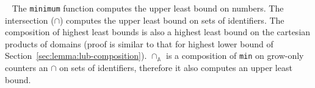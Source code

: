 \documentclass[9pt, oneside]{article}   	%
\begin{document}
\pfsketch~	The \texttt{minimum} function computes the upper least bound on numbers. The intersection ($\cap$) computes the upper least bound on sets of identifiers. The composition of highest least bounds is also a highest least bound on the cartesian products of domains (proof is similar to that for highest lower bound of Section~\ref{sec:lemma:lub-composition}). $\cap_\mathds{A}$ is a composition of \texttt{min} on grow-only counters an $\cap$ on sets of identifiers, therefore it also computes an upper least bound.
\end{document}
